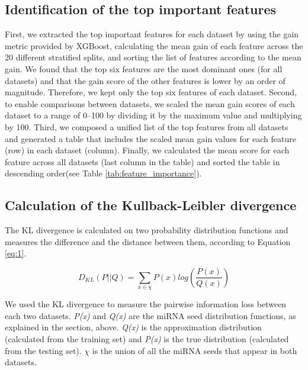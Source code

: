\documentclass{bmcart}
\begin{document}
\subsection*{Identification of the top important features} \label{ident_top_features}
First, we extracted the top important features for each dataset by using the gain metric provided by XGBoost, calculating the mean gain of each feature across the 20 different stratified splits, and sorting the list of features according to the mean gain. We found that the top six features are the most dominant ones (for all datasets) and that the gain score of the other features is lower by an order of magnitude. Therefore, we kept only the top six features of each dataset.  
Second, to enable comparisons between datasets, we scaled the mean gain scores of each dataset to a range of 0--100 by dividing it by the maximum value and multiplying by 100. 
Third, we composed a unified list of the top features from all datasets and generated a table that includes the scaled mean gain values for each feature (row) in each dataset (column). Finally, we calculated the mean score for each feature across all datasets (last column in the table) and sorted the table in descending order(see Table \ref{tab:feature_importance}).

\subsection*{Calculation of the Kullback-Leibler divergence} \label{methods_kl}
The KL divergence is calculated on two probability distribution functions and measures the difference and the distance between them, according to Equation \ref{eq:1}.

\begin{equation}
 D_{KL} \left (P ||Q \right ) = \sum_{x\in \chi }{P\left ( x \right )log\left ( \frac{P\left ( x \right )}{Q\left ( x \right )} \right )}\label{eq:1}
\end{equation}

We used the KL divergence to measure the pairwise information loss between each two datasets. \textit{P(x)} and \textit{Q(x)} are the miRNA seed distribution functions, as explained in the  section, above. \textit{Q(x)} is the approximation distribution (calculated from the training set) and \textit{P(x)} is the true distribution (calculated from the testing set). $\chi$ is the union of all the miRNA seeds that appear in both datasets.
\end{document}
